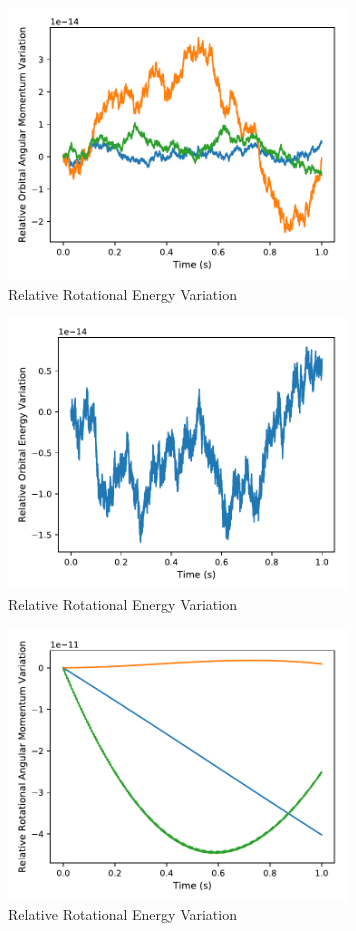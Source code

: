\documentclass[]{BasiliskReportMemo}
\begin{document}
\begin{figure}[h]
		\centering
		\includegraphics[width=9cm]{Figures/OAM_Dtime00001s.pdf}
		\caption{Relative Rotational Energy Variation}
		\label{fig:OAMD0001s}
	\end{figure}
\begin{figure}[h]
		\centering
		\includegraphics[width=9cm]{Figures/OE_Dtime00001s.pdf}
		\caption{Relative Rotational Energy Variation}
		\label{fig:OED0001s}
	\end{figure}
\begin{figure}[h]
		\centering
		\includegraphics[width=9cm]{Figures/RAM_Dtime00001s.pdf}
		\caption{Relative Rotational Energy Variation}
		\label{fig:RAMD0001s}
	\end{figure}
\end{document}
